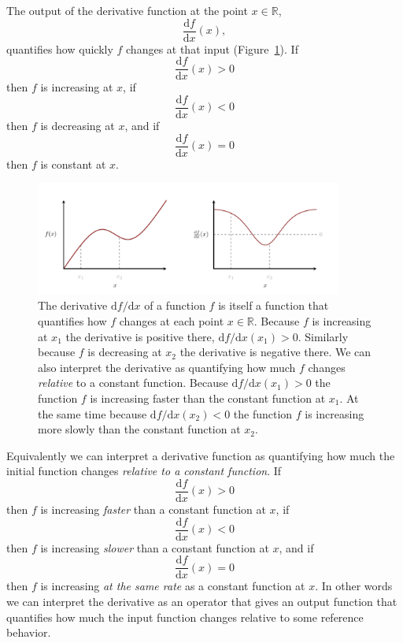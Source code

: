 \documentclass[
  letterpaper,
  DIV=11,
  numbers=noendperiod]{scrartcl}
\begin{document}
The output of the derivative function at the point \(x \in \mathbb{R}\),
\[
\frac{ \mathrm{d} f }{ \mathrm{d} x}(x),
\] quantifies how quickly \(f\) changes at that input
(Figure~\ref{fig-differentiation}). If \[
\frac{ \mathrm{d} f }{ \mathrm{d} x}(x) > 0
\] then \(f\) is increasing at \(x\), if \[
\frac{ \mathrm{d} f }{ \mathrm{d} x}(x) < 0
\] then \(f\) is decreasing at \(x\), and if \[
\frac{ \mathrm{d} f }{ \mathrm{d} x}(x) = 0
\] then \(f\) is constant at \(x\).

\begin{figure}

{\centering \includegraphics[width=0.9\textwidth,height=\textheight]{figures/differentiation/differentiation.pdf}

}

\caption{\label{fig-differentiation}The derivative
\(\mathrm{d} f / \mathrm{d} x\) of a function \(f\) is itself a function
that quantifies how \(f\) changes at each point \(x \in \mathbb{R}\).
Because \(f\) is increasing at \(x_{1}\) the derivative is positive
there, \(\mathrm{d} f / \mathrm{d} x (x_{1}) > 0\). Similarly because
\(f\) is decreasing at \(x_{2}\) the derivative is negative there. We
can also interpret the derivative as quantifying how much \(f\) changes
\emph{relative} to a constant function. Because
\(\mathrm{d} f / \mathrm{d} x (x_{1}) > 0\) the function \(f\) is
increasing faster than the constant function at \(x_{1}\). At the same
time because \(\mathrm{d} f / \mathrm{d} x (x_{2}) < 0\) the function
\(f\) is increasing more slowly than the constant function at
\(x_{2}\).}

\end{figure}

Equivalently we can interpret a derivative function as quantifying how
much the initial function changes \emph{relative to a constant
function}. If \[
\frac{ \mathrm{d} f }{ \mathrm{d} x}(x) > 0
\] then \(f\) is increasing \emph{faster} than a constant function at
\(x\), if \[
\frac{ \mathrm{d} f }{ \mathrm{d} x}(x) < 0
\] then \(f\) is increasing \emph{slower} than a constant function at
\(x\), and if \[
\frac{ \mathrm{d} f }{ \mathrm{d} x}(x) = 0
\] then \(f\) is increasing \emph{at the same rate} as a constant
function at \(x\). In other words we can interpret the derivative as an
operator that gives an output function that quantifies how much the
input function changes relative to some reference behavior.
\end{document}
